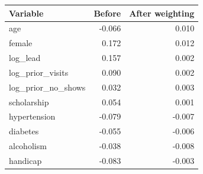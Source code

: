 \begin{tabular}{lrr}
\toprule
Variable & Before & After weighting \\
\midrule
age & -0.066 & 0.010 \\
female & 0.172 & 0.012 \\
log\_lead & 0.157 & 0.002 \\
log\_prior\_visits & 0.090 & 0.002 \\
log\_prior\_no\_shows & 0.032 & 0.003 \\
scholarship & 0.054 & 0.001 \\
hypertension & -0.079 & -0.007 \\
diabetes & -0.055 & -0.006 \\
alcoholism & -0.038 & -0.008 \\
handicap & -0.083 & -0.003 \\
\bottomrule
\end{tabular}
